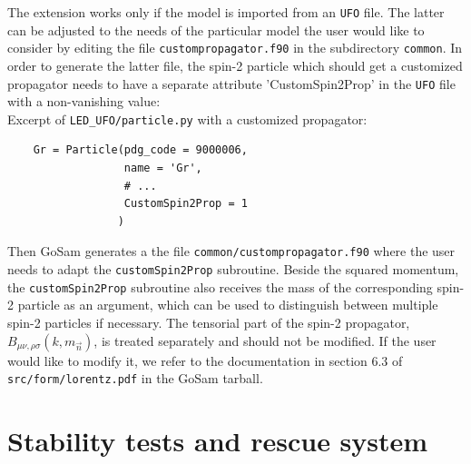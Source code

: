 \documentclass[11pt,a4paper]{refrep}
\newcommand{\gosam}{{\sc GoSam}\xspace}
\begin{document}
The extension works only if the model is imported from an {\tt UFO} file. 
The latter can  be adjusted to the needs of the particular model the 
user would like to consider by editing the file {\tt custompropagator.f90}
in the subdirectory {\tt common}. 
In order to generate the latter file,
the spin-2 particle which should get a customized propagator needs to have a
separate attribute 'CustomSpin2Prop' in the {\tt UFO} file with a non-vanishing
value:\\
Excerpt of {\tt LED\_UFO/particle.py} with a customized propagator:
\begin{verbatim}
    Gr = Particle(pdg_code = 9000006,
                  name = 'Gr',
                  # ...
                  CustomSpin2Prop = 1
                 )
\end{verbatim}
Then \gosam{} generates a the file {\tt common/custompropagator.f90} where the user needs
to adapt the {\tt customSpin2Prop} subroutine.
Beside the squared momentum, the {\tt customSpin2Prop} subroutine also receives the
mass of the corresponding spin-2 particle as an argument, which
can be used to distinguish between multiple spin-2 particles if necessary.
The tensorial part of the spin-2 propagator, $B_{\mu\nu,\rho\sigma}(k,m_{\vec n})$, is treated separately 
and should not be modified.  If the user would like to modify it, we refer to the  documentation in 
section 6.3 of {\tt src/form/lorentz.pdf} in the \gosam{} tarball.







\chapter{Stability tests and rescue system}
\label{sec:rescue}
\end{document}
